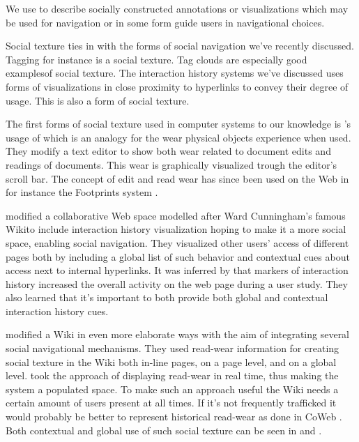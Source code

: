 We use  to describe socially constructed annotations or
visualizations which may be used for navigation or in some form guide
users in navigational choices.

Social texture ties in with the forms of social navigation we've
recently discussed. Tagging for instance is a social texture. Tag clouds are
especially good examplesof social texture.
The interaction history systems we've discussed uses forms of visualizations
in close proximity to hyperlinks to convey their degree of usage. This is also
a form of social texture.

The first forms of social texture used in computer systems to our knowledge is
\citet{hill92}'s usage of  which is an analogy for
the wear physical objects experience when used. They modify a text editor to
show both wear related to document edits and readings of documents. This wear
is graphically visualized trough the editor's scroll bar.
The concept of edit and read wear has since been used on the Web in for
instance the Footprints system \citep{wexelblat99}.

\citet{dieberger00a} modified \dash{}a collaborative Web space
modelled after Ward Cunningham's famous Wiki\dash{}to include interaction
history visualization hoping to make it a more social space, enabling social
navigation. They visualized other users' access of different pages both by
including a global list of such behavior and contextual cues about access
next to internal hyperlinks.
It was inferred by \citeauthor{dieberger00a} that markers of interaction
history increased the overall activity on the web page during a user study.
They also learned that it's important to both provide both global and
contextual interaction history cues.

\citet{xu06} modified a Wiki in even more elaborate ways
with the aim of integrating several social navigational mechanisms.
They used read-wear information for creating social
texture in the Wiki both in-line pages, on a page level, and on a global
level. \citeauthor{xu06} took the approach of displaying read-wear in real
time, thus making the system a populated space. To make such an approach
useful the Wiki needs a certain amount of users present at all times. If
it's not frequently trafficked it would probably be better to represent
historical read-wear as done in CoWeb \citep[]{dieberger00a}. Both
contextual and global use of such social texture can be seen in
 and .


